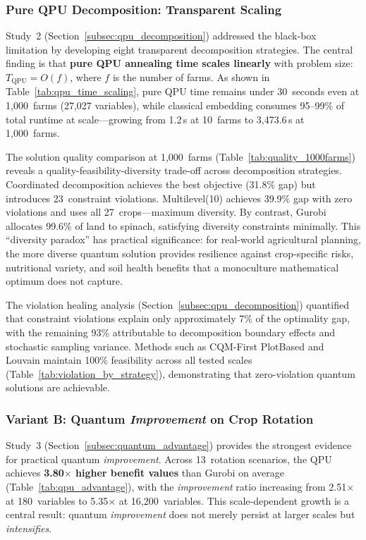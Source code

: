 \subsubsection{Pure QPU Decomposition: Transparent Scaling}

Study~2 (Section~\ref{subsec:qpu_decomposition}) addressed the black-box limitation by developing eight transparent decomposition strategies. The central finding is that \textbf{pure QPU annealing time scales linearly} with problem size: $T_{\text{QPU}} = O(f)$, where $f$ is the number of farms. As shown in Table~\ref{tab:qpu_time_scaling}, pure QPU time remains under 30~seconds even at 1,000~farms (27,027 variables), while classical embedding consumes 95--99\% of total runtime at scale---growing from 1.2\,s at 10~farms to 3,473.6\,s at 1,000~farms.

The solution quality comparison at 1,000~farms (Table~\ref{tab:quality_1000farms}) reveals a quality-feasibility-diversity trade-off across decomposition strategies. Coordinated decomposition achieves the best objective (31.8\% gap) but introduces 23~constraint violations. Multilevel(10) achieves 39.9\% gap with zero violations and uses all 27~crops---maximum diversity. By contrast, Gurobi allocates 99.6\% of land to spinach, satisfying diversity constraints minimally. This ``diversity paradox'' has practical significance: for real-world agricultural planning, the more diverse quantum solution provides resilience against crop-specific risks, nutritional variety, and soil health benefits that a monoculture mathematical optimum does not capture.

The violation healing analysis (Section~\ref{subsec:qpu_decomposition}) quantified that constraint violations explain only approximately 7\% of the optimality gap, with the remaining 93\% attributable to decomposition boundary effects and stochastic sampling variance. Methods such as CQM-First PlotBased and Louvain maintain 100\% feasibility across all tested scales (Table~\ref{tab:violation_by_strategy}), demonstrating that zero-violation quantum solutions are achievable.

\subsubsection{Variant B: Quantum \textit{Improvement} on Crop Rotation}

Study~3 (Section~\ref{subsec:quantum_advantage}) provides the strongest evidence for practical quantum \textit{improvement}. Across 13~rotation scenarios, the QPU achieves \textbf{3.80$\times$ higher benefit values} than Gurobi on average (Table~\ref{tab:qpu_advantage}), with the \textit{improvement} ratio increasing from 2.51$\times$ at 180~variables to 5.35$\times$ at 16,200~variables. This scale-dependent growth is a central result: quantum \textit{improvement} does not merely persist at larger scales but \textit{intensifies}.

